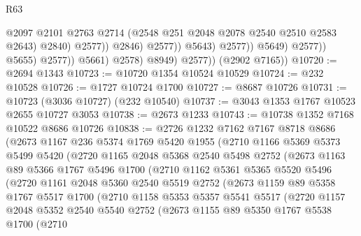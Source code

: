 \begin{lexlean}{R63}
\begin{coremodule}
                                              @2097
                                              @2101
                                              @2763
                                              @2714
                                              (@2548 @251 @2048 @2078 @2540 @2510 @2583 @2643)
                                              @2840)
                                            @2577))
                                        @2846)
                                      @2577))
                                  @5643)
                                @2577))
                            @5649)
                          @2577))
                      @5655)
                    @2577))
                @5661)
              @2578)
            @8949)
          @2577))
      (@2902 @7165))
@10720 := @2694 @1343
@10723 := @10720 @1354 @10524 @10529
@10724 := @232 @10528
@10726 := @1727 @10724 @1700
@10727 := @8687 @10726
@10731 := @10723 (@3036 @10727) (@232 @10540)
@10737 := @3043 @1353 @1767 @10523 @2655 @10727 @3053
@10738 := @2673 @1233
@10743 := @10738 @1352 @7168 @10522 @8686 @10726
@10838 := @2726
    @1232
    @7162
    @7167
    @8718
    @8686
    (@2673
      @1167
      @236
      @5374
      @1769
      @5420
      @1955
      (@2710
        @1166
        @5369
        @5373
        @5499
        @5420
        (@2720
          @1165
          @2048
          @5368
          @2540
          @5498
          @2752
          (@2673
            @1163
            @89
            @5366
            @1767
            @5496
            @1700
            (@2710
              @1162
              @5361
              @5365
              @5520
              @5496
              (@2720
                @1161
                @2048
                @5360
                @2540
                @5519
                @2752
                (@2673
                  @1159
                  @89
                  @5358
                  @1767
                  @5517
                  @1700
                  (@2710
                    @1158
                    @5353
                    @5357
                    @5541
                    @5517
                    (@2720
                      @1157
                      @2048
                      @5352
                      @2540
                      @5540
                      @2752
                      (@2673
                        @1155
                        @89
                        @5350
                        @1767
                        @5538
                        @1700
                        (@2710

\end{coremodule}
\end{lexlean}
